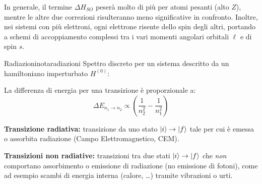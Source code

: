 In generale, il termine \(\Delta H_{SO}\) peserà molto di più per atomi pesanti (alto \(Z\)), mentre le altre due correzioni risulteranno meno significative in confronto. 
Inoltre, nei sistemi con più elettroni, ogni elettrone risente dello spin degli altri, portando a schemi di accoppiamento complessi tra i vari momenti angolari orbitali \(\ell\) e di spin \(s\).

\begin{note}{Radiazioni}{notaradiazioni}
Spettro discreto per un sistema descritto da un hamiltoniano imperturbato \( H^{(0)} \):

\begin{center}
\end{center}

La differenza di energia per una transizione è proporzionale a:
\begin{equation}
    \Delta E_{n_1 \to n_2} \propto \left( \frac{1}{n_2^2} - \frac{1}{n_1^2} \right)
\end{equation}

\textbf{Transizione radiativa:} transizione da uno stato \( \ket{i} \to \ket{f} \) tale per cui è emessa o assorbita radiazione (Campo Elettromagnetico, CEM).

\textbf{Transizioni non radiative:} transizioni tra due stati \( \ket{i} \to \ket{f} \) che \emph{non} comportano assorbimento o emissione di radiazione (no emissione di fotoni), come ad esempio scambi di energia interna (calore, \dots) tramite vibrazioni o urti.

\begin{center}
\end{center}
\end{note}
